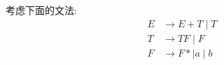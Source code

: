 \documentclass[boxes]{homework}
\begin{document}
\begin{problem}
考虑下面的文法:
\begin{equation}
    \label{eq:19.1}
    \begin{aligned}
        E & \to E + T \mid T      \\
        T & \to T F \mid F        \\
        F & \to F * \mid a \mid b
    \end{aligned}
\end{equation}
\end{problem}
\end{document}
